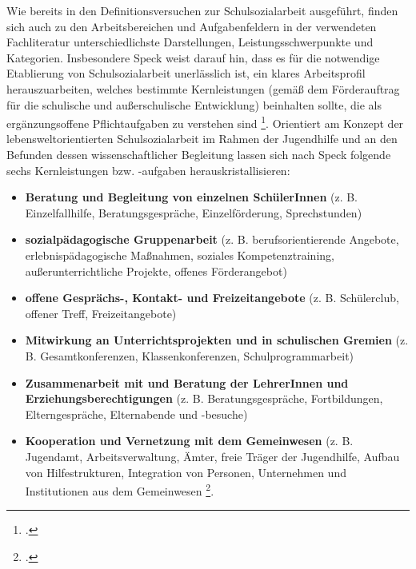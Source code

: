 Wie bereits in den Definitionsversuchen zur Schulsozialarbeit ausgeführt, finden sich auch zu den Arbeitsbereichen und Aufgabenfeldern in der verwendeten Fachliteratur unterschiedlichste Darstellungen, Leistungsschwerpunkte und Kategorien. Insbesondere Speck weist darauf hin, dass es für die notwendige Etablierung von Schulsozialarbeit unerlässlich ist, ein klares Arbeitsprofil herauszuarbeiten, welches bestimmte Kernleistungen (gemäß dem Förderauftrag für die schulische und außerschulische Entwicklung) beinhalten sollte, die als ergänzungsoffene Pflichtaufgaben zu verstehen sind \footcite[vgl.][62]{Speck2007}. Orientiert am Konzept der lebensweltorientierten Schulsozialarbeit im Rahmen der Jugendhilfe und an den Befunden dessen wissenschaftlicher Begleitung lassen sich nach Speck folgende sechs Kernleistungen bzw. -aufgaben herauskristallisieren: 
\begin{itemize}
	\item \textbf{Beratung und Begleitung von einzelnen SchülerInnen} (z. B. Einzelfallhilfe, Beratungsgespräche, Einzelförderung, Sprechstunden)
	\item \textbf{sozialpädagogische Gruppenarbeit} (z. B. berufsorientierende Angebote, erlebnispädagogische Maßnahmen, soziales Kompetenztraining, außerunterrichtliche Projekte, offenes Förderangebot)
	\item \textbf{offene Gesprächs-, Kontakt- und Freizeitangebote} (z. B. Schülerclub, offener Treff, Freizeitangebote)
	\item \textbf{Mitwirkung an Unterrichtsprojekten und in schulischen Gremien} (z. B. Gesamtkonferenzen, Klassenkonferenzen, Schulprogrammarbeit)
	\item \textbf{Zusammenarbeit mit und Beratung der LehrerInnen und Erziehungsberechtigungen} (z. B. Beratungsgespräche, Fortbildungen, Elterngespräche, Elternabende und -besuche)
	\item \textbf{Kooperation und Vernetzung mit dem Gemeinwesen} (z. B. Jugendamt, Arbeitsverwaltung, Ämter, freie Träger der Jugendhilfe, Aufbau von Hilfestrukturen, Integration von Personen, Unternehmen und Institutionen aus dem Gemeinwesen \footcite[vgl.][63f]{Speck2007}.
\end{itemize}

